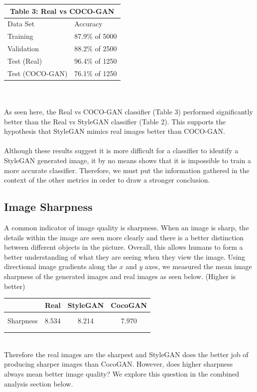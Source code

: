 \documentclass[12pt]{article}
\begin{document}
\begin{multicols*}{2}
\begin{tabular}{ |p{4cm}|p{3cm}|  }
             \multicolumn{2}{|c|}{Table 3: Real vs COCO-GAN} \\
             \hline
            Data Set     & Accuracy\\
             \hline
            Training        & 87.9\% of 5000 \\
             \hline
            Validation      & 88.2\% of 2500 \\
             \hline
            Test (Real)     & 96.4\% of 1250 \\
             \hline
            Test (COCO-GAN) & 76.1\% of 1250 \\
             \hline
        \end{tabular}
        \\\\
        As seen here, the Real vs COCO-GAN classifier (Table 3) performed significantly better than the Real vs StyleGAN classifier (Table 2).
        This supports the hypothesis that StyleGAN mimics real images better than COCO-GAN.\\\\
        Although these results suggest it is more difficult for a classifier to identify a StyleGAN generated image, it by no means shows that it is impossible to train a more accurate classifier.
        Therefore, we must put the information gathered in the context of the other metrics in order to draw a stronger conclusion.

        \subsection{Image Sharpness}
        \label{subsec:imageSharpness}
        A common indicator of image quality is sharpness.
        When an image is sharp, the details within the image are seen more clearly and there is a better distinction between different objects in the picture.
        Overall, this allows humans to form a better understanding of what they are seeing when they view the image.
        Using directional image gradients along the $x$ and $y$ axes, we measured the mean image sharpness of the generated images and real images as seen below. (Higher is better)
        \\
        \begin{table}[h]
        \centering
        \begin{tabular}{cccc}
                 & Real & StyleGAN & CocoGAN  \\ \hline \\
        Sharpness & 8.534    & 8.214      & 7.970     \\ \\ \hline \\
        \end{tabular}
        \end{table}
        \\
        Therefore the real images are the sharpest and StyleGAN does the better job of producing sharper images than CocoGAN.
        However, does higher sharpness always mean better image quality?
        We explore this question in the combined analysis section below.


\end{multicols*}
\end{document}
